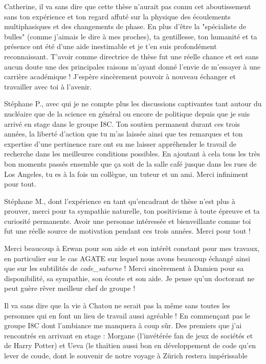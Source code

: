 \npar
Catherine, il va sans dire que cette thèse n'aurait pas connu cet aboutissement sans ton expérience et ton regard affuté sur la physique des écoulements multiphasiques et des changements de phase. En plus d'être la "spécialiste de bulles" (comme j'aimais le dire à mes proches), ta gentillesse, ton humanité et ta présence ont été d'une aide inestimable et je t'en suis profondément reconnaissant. T'avoir comme directrice de thèse fut une réelle chance et est sans aucun doute une des principales raisons m'ayant donné l'envie de m'essayer à une carrière académique ! J'espère sincèrement pouvoir à nouveau échanger et travailler avec toi à l'avenir.

\npar

Stéphane P., avec qui je ne compte plus les discussions captivantes tant autour du nucléaire que de la science en général ou encore de politique depuis que je suis arrivé en stage dans le groupe I8C.  Ton soutien permanent durant ces trois années, la liberté d'action que tu m'as laissée ainsi que tes remarques et ton expertise d'une pertinence rare ont su me laisser appréhender le travail de recherche dans les meilleures conditions possibles. En ajoutant à cela tous les très bon moments passés ensemble que ça soit de la salle café jusque dans les rues de Los Angeles, tu es à la fois un collègue, un tuteur et un ami. Merci infiniment pour tout.

\npar

Stéphane M., dont l'expérience en tant qu'encadrant de thèse n'est plus à prouver, merci pour ta sympathie naturelle, ton positivisme à toute épreuve et ta curiosité permanente. Avoir une personne intéressée et bienveillante comme toi fut une réelle source de motivation pendant ces trois années. Merci pour tout !

\npar

Merci beaucoup à Erwan pour son aide et son intérêt constant pour mes travaux, en particulier sur le cas AGATE sur lequel nous avons beaucoup échangé ainsi que sur les subtilités de \textit{code\_saturne} ! Merci sincèrement à Damien pour sa disponibilité, sa sympathie, son écoute et son aide. Je pense qu'un doctorant ne peut guère rêver meilleur chef de groupe !

\npar

Il va sans dire que la vie à Chatou ne serait pas la même sans toutes les personnes qui en font un lieu de travail aussi agréable ! En commençant pas le groupe I8C dont l'ambiance me manquera à coup sûr. Des premiers que j'ai rencontrés en arrivant en stage : Morgane (l'invétérée fan de jeux de sociétés et de Harry Potter) et Ueva (le thaïtien aussi bon en développement de code qu'en lever de coude, dont le souvenir de notre voyage à Zürich restera impérissable

